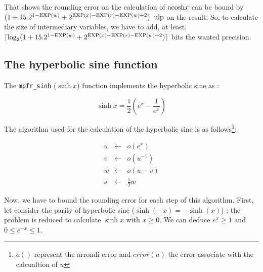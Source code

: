 \documentclass[12pt]{amsart}
\def\n{\textnormal}
\def\ulp{{\rm ulp}}
\def\Exp{{\rm EXP}}
\begin{document}
That shows the rounding error on the calculation of $\n{acosh} x$ can
be bound by $ (1+15.2^{1-\Exp(w)}+2^{\Exp(x)-\Exp(r)-\Exp(w)+2})\;\;
\ulp$ on the result. So, to calculate the size of intermediary
variables, we have to add, at least, $\lceil \log_2
(1+15.2^{1-\Exp(w)}+2^{\Exp(x)-\Exp(r)-\Exp(w)+2}) \rceil$ bits the
wanted precision.
 
\subsection{The hyperbolic sine function}

The {\tt mpfr\_sinh} ($\sinh{x}$) function implements the hyperbolic
sine as :

$$
\sinh x = \frac{1}{2} \left( e^{x} - \frac{1}{e^x} \right) 
$$

The algorithm used for the calculation of the hyperbolic sine is as follows\footnote{$o()$ represent the arrondi error and $error(u)$ the
  error associate with the calcualtion of $u$}:

\begin{eqnarray}\nonumber
u&\leftarrow&o(e^x)\\\nonumber
v&\leftarrow&o({u}^{-1})\\\nonumber
w&\leftarrow&o(u-v)\\\nonumber
s&\leftarrow&\frac{1}{2} w
\end{eqnarray}

Now, we have to bound the rounding error for each step of this
algorithm.  First, let consider the parity of hyperbolic sine
($\sinh(-x)=-\sinh(x)$) : the problem is reduced to calculate $\sinh x$
with $x \geq 0$. We can deduce $e^x \geq 1$ and $0 \leq e^{-x} \leq
1$.
\end{document}
